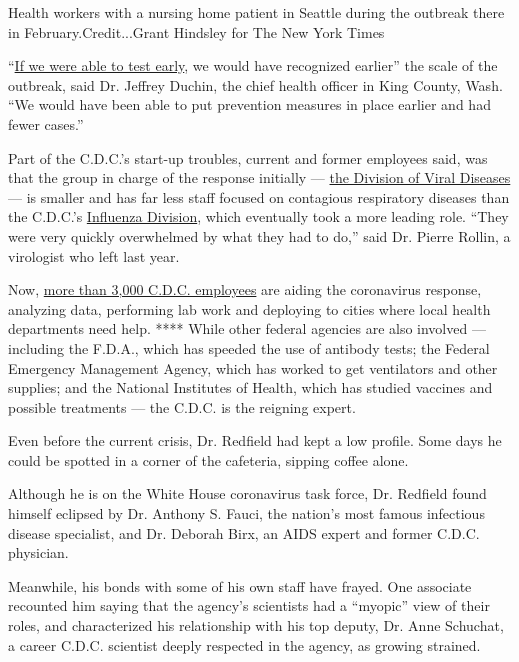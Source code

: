 Health workers with a nursing home patient in Seattle during the
outbreak there in February.Credit...Grant Hindsley for The New York
Times

``\href{https://www.documentcloud.org/documents/6933935-CDC-and-State-Health-Officials-Debate-Start-up.html\#document/p31/a565892}{If
we were able to test early}, we would have recognized earlier'' the
scale of the outbreak, said Dr. Jeffrey Duchin, the chief health officer
in King County, Wash. ``We would have been able to put prevention
measures in place earlier and had fewer cases.''

Part of the C.D.C.'s start-up troubles, current and former employees
said, was that the group in charge of the response initially ---
\href{https://www.cdc.gov/ncird/dvd.html}{the Division of Viral
Diseases} --- is smaller and has far less staff focused on contagious
respiratory diseases than the C.D.C.'s
\href{https://www.cdc.gov/ncird/flu.html}{Influenza Division}, which
eventually took a more leading role. ``They were very quickly
overwhelmed by what they had to do,'' said Dr. Pierre Rollin, a
virologist who left last year.

Now,
\href{https://www.documentcloud.org/documents/6933940-CDC-STAFFING-INFO.html}{more
than 3,000 C.D.C. employees} are aiding the coronavirus response,
analyzing data, performing lab work and deploying to cities where local
health departments need help. **** While other federal agencies are also
involved --- including the F.D.A., which has speeded the use of antibody
tests; the Federal Emergency Management Agency, which has worked to get
ventilators and other supplies; and the National Institutes of Health,
which has studied vaccines and possible treatments --- the C.D.C. is the
reigning expert.

Even before the current crisis, Dr. Redfield had kept a low profile.
Some days he could be spotted in a corner of the cafeteria, sipping
coffee alone.

Although he is on the White House coronavirus task force, Dr. Redfield
found himself eclipsed by Dr. Anthony S. Fauci, the nation's most famous
infectious disease specialist, and Dr. Deborah Birx, an AIDS expert and
former C.D.C. physician.

Meanwhile, his bonds with some of his own staff have frayed. One
associate recounted him saying that the agency's scientists had a
``myopic'' view of their roles, and characterized his relationship with
his top deputy, Dr. Anne Schuchat, a career C.D.C. scientist deeply
respected in the agency, as growing strained.

